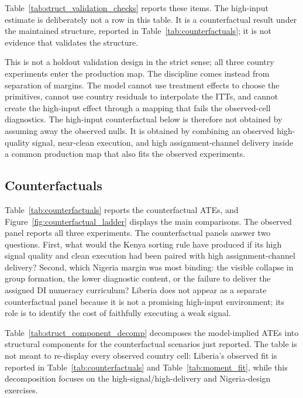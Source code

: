 \documentclass[11pt]{article}
\begin{document}
Table~\ref{tab:struct_validation_checks} reports these items. The high-input estimate is deliberately not a row in this table. It is a counterfactual result under the maintained structure, reported in Table~\ref{tab:counterfactuals}; it is not evidence that validates the structure.



This is not a holdout validation design in the strict sense; all three country experiments enter the production map. The discipline comes instead from separation of margins. The model cannot use treatment effects to choose the primitives, cannot use country residuals to interpolate the ITTs, and cannot create the high-input effect through a mapping that fails the observed-cell diagnostics. The high-input counterfactual below is therefore not obtained by assuming away the observed nulls. It is obtained by combining an observed high-quality signal, near-clean execution, and high assignment-channel delivery inside a common production map that also fits the observed experiments.

\subsection{Counterfactuals}
\label{subsec:struct_counterfactuals}

Table~\ref{tab:counterfactuals} reports the counterfactual ATEs, and Figure~\ref{fig:counterfactual_ladder} displays the main comparisons. The observed panel reports all three experiments. The counterfactual panels answer two questions. First, what would the Kenya sorting rule have produced if its high signal quality and clean execution had been paired with high assignment-channel delivery? Second, which Nigeria margin was most binding: the visible collapse in group formation, the lower diagnostic content, or the failure to deliver the assigned DI numeracy curriculum? Liberia does not appear as a separate counterfactual panel because it is not a promising high-input environment; its role is to identify the cost of faithfully executing a weak signal.



Table~\ref{tab:struct_component_decomp} decomposes the model-implied ATEs into structural components for the counterfactual scenarios just reported. The table is not meant to re-display every observed country cell: Liberia's observed fit is reported in Table~\ref{tab:counterfactuals} and Table~\ref{tab:moment_fit}, while this decomposition focuses on the high-signal/high-delivery and Nigeria-design exercises.
\end{document}
